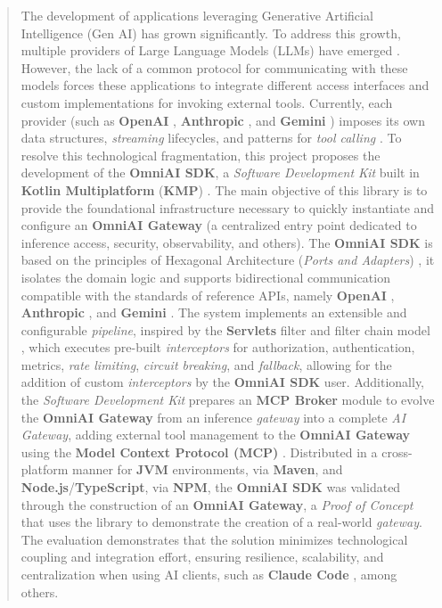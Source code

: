 \renewcommand{\abstractname}{Abstract}
\begin{abstract}
The development of applications leveraging Generative Artificial Intelligence (Gen AI)\cite{ibm_generative_ai} has grown significantly. To address this growth, multiple providers of Large Language Models (LLMs) have emerged \cite{ibm_llm_topics}. However, the lack of a common protocol for communicating with these models forces these applications to integrate different access interfaces and custom implementations for invoking external tools. Currently, each provider (such as \textbf{OpenAI} \cite{openai_api}, \textbf{Anthropic} \cite{anthropic_api}, and \textbf{Gemini} \cite{google_gemini_api}) imposes its own data structures, \textit{streaming} lifecycles, and patterns for \textit{tool calling} \cite{ibm_tool_calling}\cite{toolCallingCycle}. To resolve this technological fragmentation, this project proposes the development of the \textbf{OmniAI SDK}, a \textit{Software Development Kit} built in \textbf{Kotlin Multiplatform} (\textbf{KMP}) \cite{kmp_ref}. The main objective of this library is to provide the foundational infrastructure necessary to quickly instantiate and configure an \textbf{OmniAI Gateway} (a centralized entry point dedicated to inference access, security, observability, and others). 
The \textbf{OmniAI SDK} is based on the principles of Hexagonal Architecture (\textit{Ports and Adapters}) \cite{hexagonal_ports}, it isolates the domain logic and supports bidirectional communication compatible with the standards of reference APIs, namely \textbf{OpenAI} \cite{openai_api}, \textbf{Anthropic} \cite{anthropic_api}, and \textbf{Gemini} \cite{google_gemini_api}. The system implements an extensible and configurable \textit{pipeline}, 
inspired by the \textbf{Servlets} filter and filter chain model \cite{java_servlet_filter}\cite{java_servlet_filterchain}, which executes pre-built \textit{interceptors} for authorization, 
authentication, metrics, \textit{rate limiting}, \textit{circuit breaking}, and \textit{fallback}, allowing for the addition of custom \textit{interceptors} by the \textbf{OmniAI SDK} user. 
Additionally, the \textit{Software Development Kit} prepares an \textbf{MCP Broker} module to evolve the \textbf{OmniAI Gateway} from an inference \textit{gateway} into a complete \textit{AI Gateway}, adding external tool management to the \textbf{OmniAI Gateway} using the \textbf{Model Context Protocol (MCP)} \cite{mcp_protocol}. Distributed in a cross-platform manner for \textbf{JVM} environments, 
via \textbf{Maven}, and \textbf{Node.js}/\textbf{TypeScript}, via \textbf{NPM}, the \textbf{OmniAI SDK} was validated through the construction of an \textbf{OmniAI Gateway}, 
a \textit{Proof of Concept} that uses the library to demonstrate the creation of a real-world \textit{gateway}. The evaluation demonstrates that the solution 
minimizes technological coupling and integration effort, ensuring resilience, scalability, and centralization when using AI clients, such as \textbf{Claude Code} \cite{claude_code}, among others.
\end{abstract}
